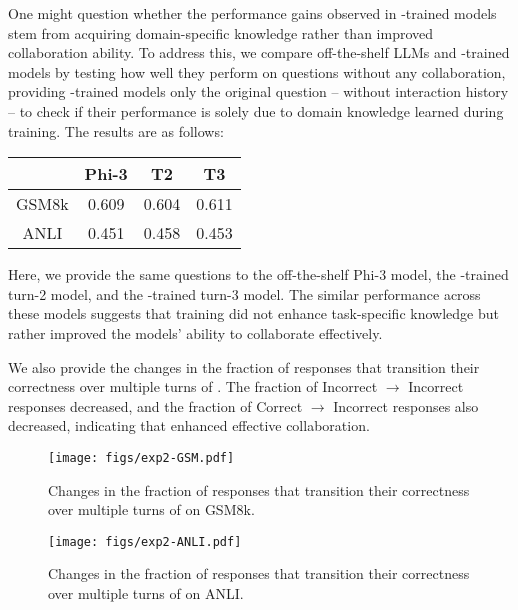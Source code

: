 \begin{remark}
\upshape
One might question whether the performance gains observed in \ours-trained models stem from acquiring domain-specific knowledge rather than improved collaboration ability. To address this, we compare off-the-shelf LLMs and \ours-trained models by testing how well they perform on questions without any collaboration, providing \ours-trained models only the original question -- without interaction history -- to check if their performance is solely due to domain knowledge learned during training. The results are as follows:

\begin{table}[h!]
\small
\centering
\begin{tabular}{|c|c|c|c|}
\hline & \textbf{Phi-3} & \textbf{\oursspace T2} & \textbf{\oursspace T3} \\
\hline
GSM8k & 0.609 & 0.604 & 0.611 \\
\hline
ANLI & 0.451 & 0.458 & 0.453 \\
\hline
\end{tabular}
\end{table}
Here, we provide the same questions to the off-the-shelf Phi-3 model, the \ours-trained turn-2 model, and the \ours-trained turn-3 model. The similar performance across these models suggests that \oursspace training did not enhance task-specific knowledge but rather improved the models' ability to collaborate effectively. 
\end{remark}

\safevspace{-3mm}
We also provide the changes in the fraction of responses that transition their correctness over multiple turns of \ours. The fraction of Incorrect $\to$ Incorrect responses decreased, and the fraction of Correct $\to$ Incorrect responses also decreased, indicating that \oursspace enhanced effective collaboration.

\safevspace{-6mm}

\begin{figure}[!h]
    \centering
    \texttt{[image: figs/exp2-GSM.pdf]}
\safevspace{-1mm}
    \caption{Changes in the fraction of responses that transition their correctness over multiple turns of \oursspace on GSM8k.} 
    \label{fig:chart-GSM}
\end{figure}
\safevspace{-6mm}

\begin{figure}[!h]
    \centering
    \texttt{[image: figs/exp2-ANLI.pdf]}
    \caption{Changes in the fraction of responses that transition their correctness over multiple turns of \oursspace on ANLI.}
    \label{fig:chart-ANLI}
\end{figure}

